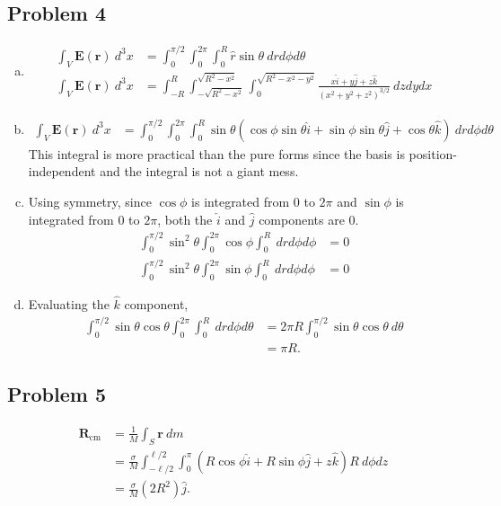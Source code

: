 \documentclass[10pt]{mypackage}
\begin{document}
\subsection{Problem 4}%
\begin{enumerate}[(a)]
  \item 
    \begin{align*}
      \int_{V}^{} \mathbf{E}\left(\mathbf{r}\right)\:d^3x &= \int_{0}^{\pi/2}\int_{0}^{2\pi}\int_{0}^{R} \hat{r}\sin\theta \:drd\phi d\theta\\
      \int_{V}^{} \mathbf{E}\left(\mathbf{r}\right)\:d^3 x &= \int_{-R}^{R}\int_{-\sqrt{R^2-x^2}}^{\sqrt{R^2-x^2}}\int_{0}^{\sqrt{R^2-x^2 - y^2}} \frac{x\hat{i} + y\hat{j} + z\hat{k}}{\left(x^2 + y^2 + z^2\right)^{3/2}}\:dz dy dx
    \end{align*}
  \item 
    \begin{align*}
      \int_{V}^{} \mathbf{E}\left(\mathbf{r}\right)\:d^3 x &= \int_{0}^{\pi/2}\int_{0}^{2\pi}\int_{0}^{R} \sin\theta \left(\cos\phi\sin\theta\hat{i} + \sin\phi\sin\theta\hat{j} + \cos\theta\hat{k}\right)\:dr d\phi d\theta
    \end{align*}
    This integral is more practical than the pure forms since the basis is position-independent and the integral is not a giant mess.
  \item Using symmetry, since $\cos\phi$ is integrated from $0$ to $2\pi$ and $\sin\phi$ is integrated from $0$ to $2\pi$, both the $\hat{i}$ and $\hat{j}$ components are $0$.
    \begin{align*}
      \int_{0}^{\pi/2} \sin^2\theta \int_{0}^{2\pi}\cos\phi\int_{0}^{R}\:dr d\phi d\phi &= 0\\
      \int_{0}^{\pi/2} \sin^2\theta \int_{0}^{2\pi}\sin\phi\int_{0}^{R}\:dr d\phi d\phi &= 0
    \end{align*}
  \item Evaluating the $\hat{k}$ component,
    \begin{align*}
      \int_{0}^{\pi/2}\sin\theta\cos\theta \int_{0}^{2\pi}\int_{0}^{R} \:dr d\phi d\theta &= 2\pi R \int_{0}^{\pi/2} \sin\theta\cos\theta\:d\theta\\
                                                                                          &= \pi R.
    \end{align*}
\end{enumerate}
\subsection{Problem 5}%
\begin{align*}
  \mathbf{R}_{\text{cm}} &= \frac{1}{M}\int_{S}^{} \mathbf{r}\:dm\\
                         &= \frac{\sigma}{M}\int_{-\ell/2}^{\ell/2}\int_{0}^{\pi} \left(R\cos\phi\hat{i} + R\sin\phi\hat{j} + z\hat{k} \right)R\:d\phi dz\\
                         &= \frac{\sigma}{M} \left(2R^2\right) \hat{j}.
\end{align*}
\end{document}
